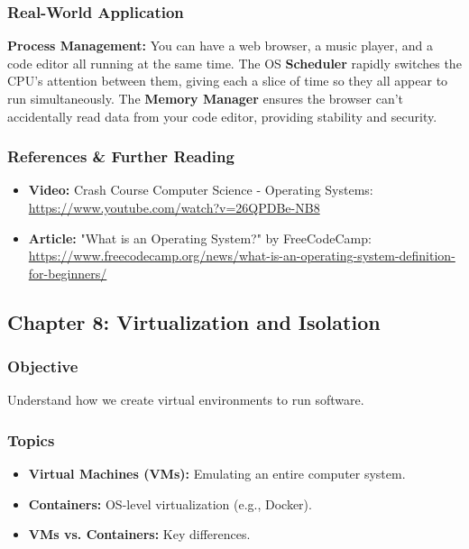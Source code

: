 \documentclass{article}
\begin{document}
\subsubsection{Real-World Application}
\textbf{Process Management:} You can have a web browser, a music player, and a code editor all running at the same time. The OS \textbf{Scheduler} rapidly switches the CPU's attention between them, giving each a slice of time so they all appear to run simultaneously. The \textbf{Memory Manager} ensures the browser can't accidentally read data from your code editor, providing stability and security.

\subsubsection{References \& Further Reading}
\begin{itemize}
    \item \textbf{Video:} Crash Course Computer Science - Operating Systems: \url{https://www.youtube.com/watch?v=26QPDBe-NB8}
    \item \textbf{Article:} "What is an Operating System?" by FreeCodeCamp: \url{https://www.freecodecamp.org/news/what-is-an-operating-system-definition-for-beginners/}
\end{itemize}

\subsection{Chapter 8: Virtualization and Isolation}
\subsubsection{Objective}
Understand how we create virtual environments to run software.

\subsubsection{Topics}
\begin{itemize}
    \item \textbf{Virtual Machines (VMs):} Emulating an entire computer system.
    \item \textbf{Containers:} OS-level virtualization (e.g., Docker).
    \item \textbf{VMs vs. Containers:} Key differences.
\end{itemize}
\end{document}
